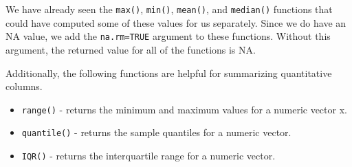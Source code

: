 \documentclass[
  letterpaper,
]{latex/krantz}
\makeatletter
\newenvironment{Shaded}{\begin{snugshade}}{\end{snugshade}}
\newcommand{\AttributeTok}[1]{\textcolor[rgb]{0.40,0.45,0.13}{#1}}
\newcommand{\CommentTok}[1]{\textcolor[rgb]{0.37,0.37,0.37}{#1}}
\newcommand{\ConstantTok}[1]{\textcolor[rgb]{0.56,0.35,0.01}{#1}}
\newcommand{\FunctionTok}[1]{\textcolor[rgb]{0.28,0.35,0.67}{#1}}
\newcommand{\NormalTok}[1]{\textcolor[rgb]{0.00,0.23,0.31}{#1}}
\newcommand{\SpecialCharTok}[1]{\textcolor[rgb]{0.37,0.37,0.37}{#1}}
\providecommand{\tightlist}{%
  \setlength{\itemsep}{0pt}\setlength{\parskip}{0pt}}\usepackage{longtable,booktabs,array}
\newenvironment{kframe}{%
\medskip{}
\setlength{\fboxsep}{.8em}
 \def\at@end@of@kframe{}%
 \ifinner\ifhmode%
  \def\at@end@of@kframe{\end{minipage}}%
  \begin{minipage}{\columnwidth}%
 \fi\fi%
 \def\FrameCommand##1{\hskip\@totalleftmargin \hskip-\fboxsep
 \colorbox{shadecolor}{##1}\hskip-\fboxsep
     \hskip-\linewidth \hskip-\@totalleftmargin \hskip\columnwidth}%
 \MakeFramed {\advance\hsize-\width
   \@totalleftmargin\z@ \linewidth\hsize
   \@setminipage}}%
 {\par\unskip\endMakeFramed%
 \at@end@of@kframe}
\renewenvironment{Shaded}{\begin{kframe}}{\end{kframe}}
\makeatother
\begin{document}
\begin{Shaded}
\end{Shaded}

We have already seen the \texttt{max()}, \texttt{min()},
\texttt{mean()}, and \texttt{median()} functions that could have
computed some of these values for us separately. Since we do have an NA
value, we add the \texttt{na.rm=TRUE} argument to these functions.
Without this argument, the returned value for all of the functions is
NA.

\begin{Shaded}
\end{Shaded}

Additionally, the following functions are helpful for summarizing
quantitative columns.

\begin{itemize}
\tightlist
\item
  \texttt{range()} - returns
  the minimum and maximum values for a numeric vector x.
\item
  \texttt{quantile()}
  - returns the sample quantiles for a numeric vector.
\item
  \texttt{IQR()} - returns the
  interquartile range for a numeric vector.
\end{itemize}
\end{document}
